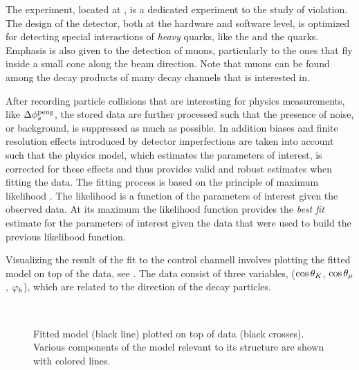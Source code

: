 The \lhcb experiment, located at \cern, is a dedicated experiment to the study of \CP violation.
The design of the detector, both at the hardware and software level, is optimized for detecting
special interactions of {\it heavy} quarks, like the \bquark and the \cquark quarks.
Emphasis is also given to the detection of muons, particularly to the ones that fly
inside a small cone along the beam direction. Note that muons can be found among the decay
products of many decay channels that \lhcb is interested in.

After recording particle collisions that are interesting for physics measurements, like $\Delta\phi_{s}^{\tiny\text{peng}}$,
the stored data are further processed such that the presence of noise, or background, is suppressed as much
as possible. In addition biases and finite resolution effects introduced by detector imperfections are
taken into account such that the physics model, which estimates the parameters of interest, is
corrected for these effects and thus provides valid and robust estimates when fitting the data.
The fitting process is based on the principle of maximum likelihood \cite{cowan1998statistical}.
The likelihood is a function of the parameters of interest given the observed data.
At its maximum the likelihood function provides the {\it best fit} estimate for the parameters
of interest given the data that were used to build the previous likelihood function.

Visualizing the result of the fit to the \BsJpsiKst control channell involves plotting the fitted model on top of the data,
see . The data consist of three variables,
($\cos\theta_{K}$, $\cos\theta_{\mu}$, $\varphi_{\rm h}$), which are related to the direction of the \BsJpsiKst decay particles.

\begin{figure}[!t]
  \begin{subfigure}{0.5\textwidth}
    \centering
    \scalebox{1.2}{}
  \end{subfigure}%
  \hfill
  \begin{subfigure}{0.5\textwidth}
    \centering
    \scalebox{1.2}{}
  \end{subfigure}\\
  \begin{subfigure}{\textwidth}
    \centering
    \scalebox{1.2}{}
  \end{subfigure}
  \caption{Fitted model (black line) plotted on top of \BsJpsiKst data (black crosses).
           Various components of the model relevant to its \CP structure are shown with colored lines.}
  \label{app_angular_plot_thetas}
\end{figure}

